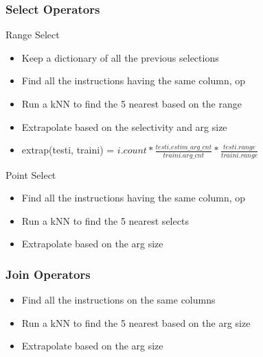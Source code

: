\begin{frame}
\frametitle{Select Operators}
\begin{block}{Range Select}
\begin{itemize}
\item Keep a dictionary of all the previous selections
\item Find all the instructions having the same column, op
\item Run a kNN to find the 5 nearest based on the range
\item Extrapolate based on the selectivity and arg size
\item extrap(testi, traini) = $i.count * \frac{testi.estim\_arg\_cnt}{traini.arg\_cnt} *  \frac{testi.range}{traini.range}$
\end{itemize}
\end{block}
\begin{block}{Point Select}
\begin{itemize}
\item Find all the instructions having the same column, op
\item Run a kNN to find the 5 nearest selects
\item Extrapolate based on the arg size
\end{itemize}
\end{block}
\end{frame}

\begin{frame}
\frametitle{Join Operators}
\begin{itemize}
\item Find all the instructions on the same columns
\item Run a kNN to find the 5 nearest based on the arg size
\item Extrapolate based on the arg size
\end{itemize}
\end{frame}
